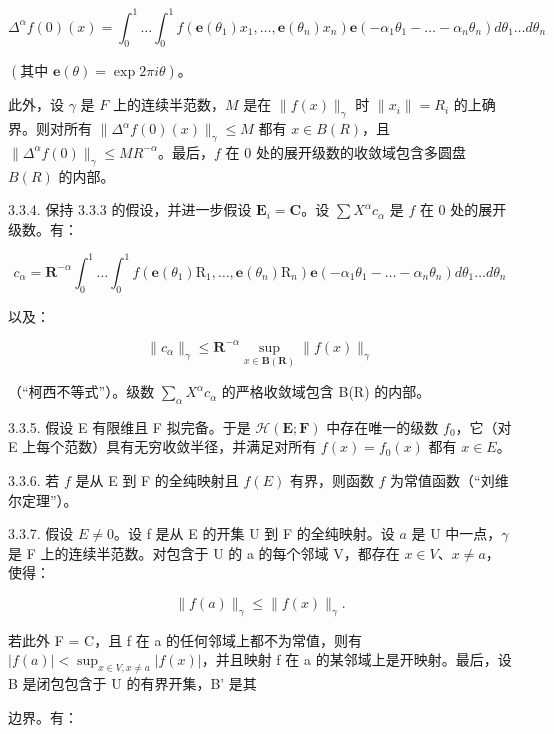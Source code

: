 \[
\Delta^ {\alpha} f (0) (x) = \int_ {0} ^ {1} \dots \int_ {0} ^ {1} f (\mathbf {e} (\theta_ {1}) x _ {1}, \dots , \mathbf {e} (\theta_ {n}) x _ {n}) \mathbf {e} (- \alpha_ {1} \theta_ {1} - \dots - \alpha_ {n} \theta_ {n}) d \theta_ {1} \dots d \theta_ {n}
\]

\((\text{其中 } \mathbf{e}(\theta) = \exp 2\pi i \theta)\)。

此外，设 \(\gamma\) 是 \(F\) 上的连续半范数，\(M\) 是在 \(\|f(x)\|_{\gamma}\) 时 \(\|x_{i}\|=R_{i}\) 的上确界。则对所有 \(\|\Delta^{\alpha}f(0)(x)\|_{\gamma}\leqslant M\) 都有 \(x\in B(R)\)，且 \(\|\Delta^{\alpha}f(0)\|_{\gamma}\leqslant MR^{-\alpha}\)。最后，\(f\) 在 0 处的展开级数的收敛域包含多圆盘 \(B(R)\) 的内部。

3.3.4. 保持 3.3.3 的假设，并进一步假设 \(\mathbf{E}_i = \mathbf{C}\)。设 \(\sum X^{\alpha}c_{\alpha}\) 是 \(f\) 在 0 处的展开级数。有：

\[
c _ {\alpha} = \mathbf {R} ^ {- \alpha} \int_ {0} ^ {1} \dots \int_ {0} ^ {1} f (\mathbf {e} (\theta_ {1}) \mathrm{R} _ {1}, \dots , \mathbf {e} (\theta_ {n}) \mathrm{R} _ {n}) \mathbf {e} (- \alpha_ {1} \theta_ {1} - \dots - \alpha_ {n} \theta_ {n}) d \theta_ {1} \dots d \theta_ {n}
\]

以及：

\[
\| c _ {\alpha} \| _ {\gamma} \leqslant \mathbf {R} ^ {- \alpha} \sup _ {x \in \mathbf {B} (\mathbf {R})} \| f (x) \| _ {\gamma}
\]

（“柯西不等式”）。级数 \(\sum_{\alpha} X^{\alpha} c_{\alpha}\) 的严格收敛域包含 B(R) 的内部。

3.3.5. 假设 E 有限维且 F 拟完备。于是 \(\mathcal{H}(\mathbf{E};\mathbf{F})\) 中存在唯一的级数 \(f_{0}\)，它（对 E 上每个范数）具有无穷收敛半径，并满足对所有 \(f(x)=f_{0}(x)\) 都有 \(x\in E\)。

3.3.6. 若 \(f\) 是从 E 到 F 的全纯映射且 \(f(E)\) 有界，则函数 \(f\) 为常值函数（“刘维尔定理”）。

3.3.7. 假设 \(E \neq 0\)。设 f 是从 E 的开集 U 到 F 的全纯映射。设 \(a\) 是 U 中一点，\(\gamma\) 是 F 上的连续半范数。对包含于 U 的 a 的每个邻域 V，都存在 \(x \in V\)、\(x \neq a\)，使得：

\[
\| f (a) \| _ {\gamma} \leqslant \| f (x) \| _ {\gamma}.
\]

若此外 F = C，且 f 在 a 的任何邻域上都不为常值，则有 \(|f(a)| < \sup_{x \in V, x \neq a} |f(x)|\)，并且映射 f 在 a 的某邻域上是开映射。最后，设 B 是闭包包含于 U 的有界开集，B' 是其

边界。有：

